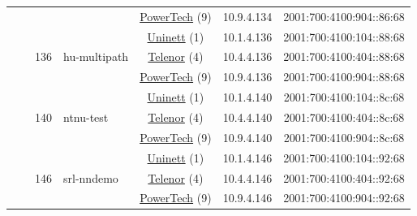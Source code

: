 \begin{small}
\begin{center}
\begin{longtable}{|c|c|c|c|c|c|c|c|}
  &  &  &  & \multicolumn{2}{|c|}{\tiny{\href{http://www.powertech.no}{PowerTech} (9)}} & \tiny{10.9.4.134} & \tiny{2001:700:4100:904::86:68} \\* \cline{3-3}\cline{4-4}\cline{5-5}\cline{6-6}\cline{7-7}\cline{8-8}
  &  & \multirow{3}{*}{\tiny{136}} & \multicolumn{1}{|l|}{\multirow{3}{*}{\tiny{hu-multipath}}} & \multicolumn{2}{|c|}{\tiny{\href{https://www.uninett.no}{Uninett} (1)}} & \tiny{10.1.4.136} & \tiny{2001:700:4100:104::88:68} \\* \cline{5-5}\cline{6-6}\cline{7-7}\cline{8-8}
  &  &  &  & \multicolumn{2}{|c|}{\tiny{\href{https://www.telenor.no}{Telenor} (4)}} & \tiny{10.4.4.136} & \tiny{2001:700:4100:404::88:68} \\* \cline{5-5}\cline{6-6}\cline{7-7}\cline{8-8}
  &  &  &  & \multicolumn{2}{|c|}{\tiny{\href{http://www.powertech.no}{PowerTech} (9)}} & \tiny{10.9.4.136} & \tiny{2001:700:4100:904::88:68} \\* \cline{3-3}\cline{4-4}\cline{5-5}\cline{6-6}\cline{7-7}\cline{8-8}
  &  & \multirow{3}{*}{\tiny{140}} & \multicolumn{1}{|l|}{\multirow{3}{*}{\tiny{ntnu-test}}} & \multicolumn{2}{|c|}{\tiny{\href{https://www.uninett.no}{Uninett} (1)}} & \tiny{10.1.4.140} & \tiny{2001:700:4100:104::8c:68} \\* \cline{5-5}\cline{6-6}\cline{7-7}\cline{8-8}
  &  &  &  & \multicolumn{2}{|c|}{\tiny{\href{https://www.telenor.no}{Telenor} (4)}} & \tiny{10.4.4.140} & \tiny{2001:700:4100:404::8c:68} \\* \cline{5-5}\cline{6-6}\cline{7-7}\cline{8-8}
  &  &  &  & \multicolumn{2}{|c|}{\tiny{\href{http://www.powertech.no}{PowerTech} (9)}} & \tiny{10.9.4.140} & \tiny{2001:700:4100:904::8c:68} \\* \cline{3-3}\cline{4-4}\cline{5-5}\cline{6-6}\cline{7-7}\cline{8-8}
  &  & \multirow{3}{*}{\tiny{146}} & \multicolumn{1}{|l|}{\multirow{3}{*}{\tiny{srl-nndemo}}} & \multicolumn{2}{|c|}{\tiny{\href{https://www.uninett.no}{Uninett} (1)}} & \tiny{10.1.4.146} & \tiny{2001:700:4100:104::92:68} \\* \cline{5-5}\cline{6-6}\cline{7-7}\cline{8-8}
  &  &  &  & \multicolumn{2}{|c|}{\tiny{\href{https://www.telenor.no}{Telenor} (4)}} & \tiny{10.4.4.146} & \tiny{2001:700:4100:404::92:68} \\* \cline{5-5}\cline{6-6}\cline{7-7}\cline{8-8}
  &  &  &  & \multicolumn{2}{|c|}{\tiny{\href{http://www.powertech.no}{PowerTech} (9)}} & \tiny{10.9.4.146} & \tiny{2001:700:4100:904::92:68} \\* \cline{3-3}\cline{4-4}\cline{5-5}\cline{6-6}\cline{7-7}\cline{8-8}

\end{longtable}
\end{center}
\end{small}
